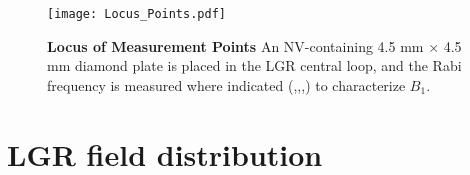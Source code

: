 

%


\begin{figure}[t!]
\centering
\texttt{[image: Locus\_Points.pdf]}  
\caption{\textbf{Locus of Measurement Points}  An NV-containing 4.5 mm $\times$ 4.5 mm diamond plate is placed in the LGR central loop, and the  Rabi frequency is measured where indicated (\textcolor{deepmagenta}{\textbullet},\textcolor{black}{\textbullet},\textcolor{red}{\textbullet},\textcolor{blue}{\textbullet}) to characterize $B_1$.}
\label{LGR_Locus}
\end{figure}


\section{LGR field distribution} \label{LGRfield}

